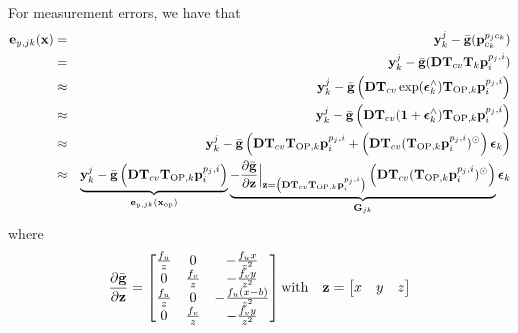 \documentclass[a4paper]{article}
\begin{document}
For measurement errors, we have that
\begin{eqnarray}
    \bm{\mathbf{e}}_{y, jk}(\bm{\mathbf{x}}) 
    &=& \bm{\mathbf{y}}^j_k - \bar{\bm{\mathbf{g}}}(\bm{\mathbf{p}}_{c_k}^{p_j c_k})\\
    &=& \bm{\mathbf{y}}^j_k - \bar{\bm{\mathbf{g}}}(\bm{\mathbf{D}} \bm{\mathbf{T}}_{cv} \bm{\mathbf{T}}_{k}\bm{\mathbf{p}}_i^{p_j, i})\\
    &\approx& \bm{\mathbf{y}}^j_k - \bar{\bm{\mathbf{g}}}\left(\bm{\mathbf{D}} \bm{\mathbf{T}}_{cv}  \exp(\bm{\mathbf{\epsilon}}_k^\wedge) \bm{\mathbf{T}}_{\text{OP}, k}\bm{\mathbf{p}}_i^{p_j, i}  \right)\\
    &\approx& \bm{\mathbf{y}}^j_k - \bar{\bm{\mathbf{g}}}\left(  \bm{\mathbf{D}} \bm{\mathbf{T}}_{cv}  (\bm{\mathbf{1}} + \bm{\mathbf{\epsilon}}_k^\wedge) \bm{\mathbf{T}}_{\text{OP}, k}\bm{\mathbf{p}}_i^{p_j, i}  \right)\\    
    &\approx& \bm{\mathbf{y}}^j_k - \bar{\bm{\mathbf{g}}}\left(  \bm{\mathbf{D}} \bm{\mathbf{T}}_{cv} \bm{\mathbf{T}}_{\text{OP}, k}\bm{\mathbf{p}}_i^{p_j, i} + \left( \bm{\mathbf{D}} \bm{\mathbf{T}}_{cv} (\bm{\mathbf{T}}_{\text{OP}, k}\bm{\mathbf{p}}_i^{p_j, i})^{\odot}  \right) \bm{\mathbf{\epsilon}}_k \right)\\    
    &\approx& \underbrace{\bm{\mathbf{y}}^j_k - \bar{\bm{\mathbf{g}}}\left(  \bm{\mathbf{D}} \bm{\mathbf{T}}_{cv} \bm{\mathbf{T}}_{\text{OP}, k}\bm{\mathbf{p}}_i^{p_j, i}\right)}_{\bm{\mathbf{e}}_{y, jk}(\bm{\mathbf{x}}_{\text{op}})} \underbrace{- \dfrac{\partial \bar{\bm{\mathbf{g}}}}{\partial \bm{\mathbf{z}}}\Big|_{\bm{\mathbf{z}}=\left(\bm{\mathbf{D}} \bm{\mathbf{T}}_{cv} \bm{\mathbf{T}}_{\text{OP}, k}\bm{\mathbf{p}}_i^{p_j, i}\right)} \left( \bm{\mathbf{D}} \bm{\mathbf{T}}_{cv} (\bm{\mathbf{T}}_{\text{OP}, k}\bm{\mathbf{p}}_i^{p_j, i})^{\odot}  \right)}_{\bm{\mathbf{G}}_{jk}} \bm{\mathbf{\epsilon}}_k 
\end{eqnarray}
where
\begin{eqnarray}
    \dfrac{\partial \bar{\bm{\mathbf{g}}}}{\partial \bm{\mathbf{z}}} = \begin{bmatrix}
      \frac{f_u}{z} & 0 & - \frac{f_u x}{z^2}\\
      0 & \frac{f_v}{z} & - \frac{f_v y}{z^2}\\
      \frac{f_u}{z} & 0 & - \frac{f_u (x-b)}{z^2}\\
      0 & \frac{f_v}{z} & - \frac{f_v y}{z^2}\\
    \end{bmatrix}
    \text{with} \quad \bm{\mathbf{z}} = \begin{bmatrix}
      x & y & z
    \end{bmatrix}
\end{eqnarray}
\end{document}
